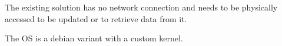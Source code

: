 \documentclass[../../main.tex]{subfiles}
\begin{document}
The existing solution has no network connection and needs to be physically accessed to be
updated or to retrieve data from it.

The OS is a debian variant with a custom kernel.
\end{document}
